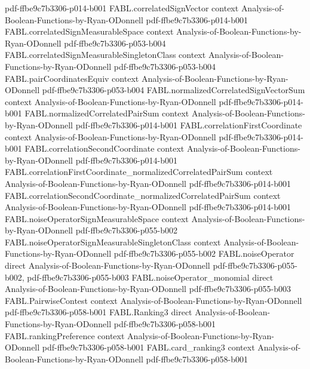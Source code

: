 \begin{theorem}
  {pdf-ffbe9c7b3306-p014-b001}
\proofstep
  {FABL.correlatedSignVector}
  {context}
  {Analysis-of-Boolean-Functions-by-Ryan-ODonnell}
  {pdf-ffbe9c7b3306-p014-b001}
\proofstep
  {FABL.correlatedSignMeasurableSpace}
  {context}
  {Analysis-of-Boolean-Functions-by-Ryan-ODonnell}
  {pdf-ffbe9c7b3306-p053-b004}
\proofstep
  {FABL.correlatedSignMeasurableSingletonClass}
  {context}
  {Analysis-of-Boolean-Functions-by-Ryan-ODonnell}
  {pdf-ffbe9c7b3306-p053-b004}
\proofstep
  {FABL.pairCoordinatesEquiv}
  {context}
  {Analysis-of-Boolean-Functions-by-Ryan-ODonnell}
  {pdf-ffbe9c7b3306-p053-b004}
\proofstep
  {FABL.normalizedCorrelatedSignVectorSum}
  {context}
  {Analysis-of-Boolean-Functions-by-Ryan-ODonnell}
  {pdf-ffbe9c7b3306-p014-b001}
\proofstep
  {FABL.normalizedCorrelatedPairSum}
  {context}
  {Analysis-of-Boolean-Functions-by-Ryan-ODonnell}
  {pdf-ffbe9c7b3306-p014-b001}
\proofstep
  {FABL.correlationFirstCoordinate}
  {context}
  {Analysis-of-Boolean-Functions-by-Ryan-ODonnell}
  {pdf-ffbe9c7b3306-p014-b001}
\proofstep
  {FABL.correlationSecondCoordinate}
  {context}
  {Analysis-of-Boolean-Functions-by-Ryan-ODonnell}
  {pdf-ffbe9c7b3306-p014-b001}
\proofstep
  {FABL.correlationFirstCoordinate_normalizedCorrelatedPairSum}
  {context}
  {Analysis-of-Boolean-Functions-by-Ryan-ODonnell}
  {pdf-ffbe9c7b3306-p014-b001}
\proofstep
  {FABL.correlationSecondCoordinate_normalizedCorrelatedPairSum}
  {context}
  {Analysis-of-Boolean-Functions-by-Ryan-ODonnell}
  {pdf-ffbe9c7b3306-p014-b001}
\proofstep
  {FABL.noiseOperatorSignMeasurableSpace}
  {context}
  {Analysis-of-Boolean-Functions-by-Ryan-ODonnell}
  {pdf-ffbe9c7b3306-p055-b002}
\proofstep
  {FABL.noiseOperatorSignMeasurableSingletonClass}
  {context}
  {Analysis-of-Boolean-Functions-by-Ryan-ODonnell}
  {pdf-ffbe9c7b3306-p055-b002}
\proofstep
  {FABL.noiseOperator}
  {direct}
  {Analysis-of-Boolean-Functions-by-Ryan-ODonnell}
  {pdf-ffbe9c7b3306-p055-b002,
    pdf-ffbe9c7b3306-p055-b003}
\proofstep
  {FABL.noiseOperator_monomial}
  {direct}
  {Analysis-of-Boolean-Functions-by-Ryan-ODonnell}
  {pdf-ffbe9c7b3306-p055-b003}
\proofstep
  {FABL.PairwiseContest}
  {context}
  {Analysis-of-Boolean-Functions-by-Ryan-ODonnell}
  {pdf-ffbe9c7b3306-p058-b001}
\proofstep
  {FABL.Ranking3}
  {direct}
  {Analysis-of-Boolean-Functions-by-Ryan-ODonnell}
  {pdf-ffbe9c7b3306-p058-b001}
\proofstep
  {FABL.rankingPreference}
  {context}
  {Analysis-of-Boolean-Functions-by-Ryan-ODonnell}
  {pdf-ffbe9c7b3306-p058-b001}
\proofstep
  {FABL.card_ranking3}
  {context}
  {Analysis-of-Boolean-Functions-by-Ryan-ODonnell}
  {pdf-ffbe9c7b3306-p058-b001}

\end{theorem}
